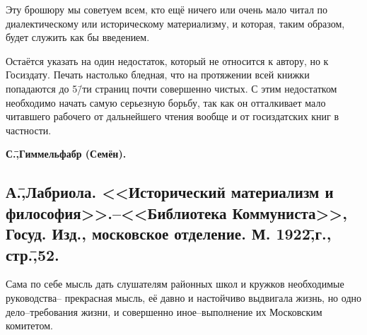 Эту брошюру мы советуем всем, кто ещё ничего или очень мало читал по диалектическому или историческому материализму, и которая, таким образом, будет служить как бы введением.

Остаётся указать на один недостаток, который не относится к автору, но к Госиздату. Печать настолько бледная, что на протяжении всей книжки попадаются до 5\=/ти страниц почти совершенно чистых. С этим недостатком необходимо начать самую серьезную борьбу, так как он отталкивает мало читавшего рабочего от дальнейшего чтения вообще и от госиздатских книг в частности.

\begin{flushright}
 \textbf{С.\=,Гиммельфабр (Семён).}\hspace*{2em}
\end{flushright}

\subsection*{А.\=,Лабриола. <<Исторический материализм и философия>>.\---<<Библиотека Коммуниста>>, Госуд. Изд., московское отделение. М. 1922\=,г., стр.\=,52.}
\label{subsec:10.7}

Сама по себе мысль дать слушателям районных школ и кружков необходимые руководства\--- прекрасная мысль, её давно и настойчиво выдвигала жизнь, но одно дело\---требования жизни, и совершенно иное\---выполнение их Московским комитетом.

